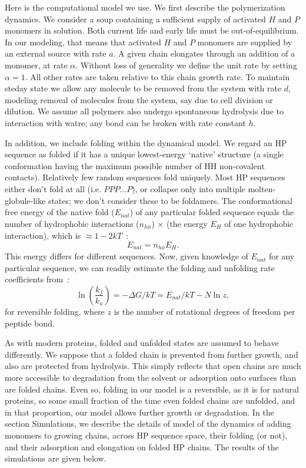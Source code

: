 \documentclass[journal=jacsat,manuscript=article,layout=twocolumn]{achemso}
\newcommand*{\ga}{\alpha}
\newcommand*{\gD}{\Delta}
\newcommand*{\pt}[1]{\left( #1\right)}
\begin{document}
 Here is the computational model we use.  We first describe the polymerization dynamics.  We 
consider a soup containing a sufficient supply of activated $H$ and $P$ monomers in solution.  Both 
current life and early life must be out-of-equilibrium.  In our modeling, that means that activated 
$H$ and $P$ monomers are supplied by an external source with rate $a$.  A given chain elongates 
through an addition of a monomer, at rate $\ga$. Without loss of generality we define the unit 
rate by setting $\ga = 1$.  All other rates are taken relative to this chain growth rate.  To 
maintain steday state we allow any
molecule to be removed from the system with rate $d$, modeling removal of molecules from the system, 
say due to cell division or dilution.  We assume 
all polymers also undergo spontaneous hydrolysis due to interaction with watre; any bond can be 
broken with rate constant $h$.  


 In addition, we include folding within the dynamical model.  We regard an HP sequence as folded if 
it has a unique lowest-energy `native' structure (a single conformation having the maximum possible 
number of HH non-covalent contacts).  Relatively few random sequences fold uniquely.  Most HP 
sequences either don't fold at all (i.e. $PPP \ldots P$), or collapse only into multiple 
molten-globule-like states; we don't consider these to be foldamers.   
The conformational free energy of the native fold ($E_{nat}$) of any particular folded sequence 
equals 
the number of hydrophobic interactions ($n_{h\phi}$) $\times$ (the energy $E_H$ of one hydrophobic 
interaction), which is $\approx 1-2kT$~\cite{Ghosh2009}:
\begin{equation}
 E_{nat}=n_{h\phi}E_H.
\end{equation} 
This energy differs for different sequences.  Now, given knowledge of $E_{nat}$ for any particular 
sequence, we can readily estimate the folding and unfolding rate coefficients from~\cite{Ghosh2009}:
\begin{equation}
 \ln\pt{\frac{k_f}{k_u}}=-\gD G/kT = E_{nat}/kT-N\ln z,
\end{equation} 
for reversible folding, where $z$ is the number of rotational degrees of freedom per peptide bond. 
 
 As with modern proteins, folded and unfolded states are assumed to behave differently.  We suppose 
that a folded chain is prevented from further growth, and also are protected from hydrolysis.  This 
simply reflects that open chains are much more accessible to degradation from the solvent or 
adsorption onto surfaces than are folded chains.  Even so, folding in our model is a reversible, as 
it is for natural proteins, so some small fraction of the time even folded chains are unfolded, and 
in that proportion, our model allows further growth or degradation.   In the section Simulations, 
we describe the details of model of the dynamics of adding 
monomers to growing chains, across HP sequence space, their folding (or not), and their adsorption 
and elongation on folded HP chains.  The results of the simulations are given below.
 
\end{document}
